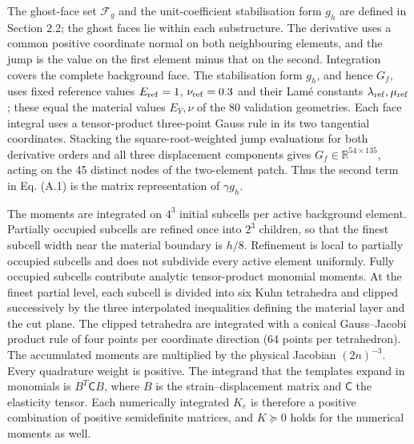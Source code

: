\documentclass[preprint,12pt,authoryear]{elsarticle}
\begin{document}
The ghost-face set \(\mathcal F_g\) and the unit-coefficient stabilisation form \(g_h\) are defined in Section 2.2; the ghost faces lie within each substructure. The derivative uses a common positive coordinate normal on both neighbouring elements, and the jump is the value on the first element minus that on the second. Integration covers the complete background face. The stabilisation form \(g_h\), and hence \(G_f\), uses fixed reference values \(E_{\rm ref}=1\), \(\nu_{\rm ref}=0.3\) and their Lamé constants \(\lambda_{\rm ref},\mu_{\rm ref}\); these equal the material values \(E_Y,\nu\) of the 80 validation geometries. Each face integral uses a tensor-product three-point Gauss rule in its two tangential coordinates. Stacking the square-root-weighted jump evaluations for both derivative orders and all three displacement components gives \(G_f\in\mathbb R^{54\times135}\), acting on the 45 distinct nodes of the two-element patch. Thus the second term in Eq. (A.1) is the matrix representation of \(\gamma g_h\).

The moments are integrated on \(4^3\) initial subcells per active background element. Partially occupied subcells are refined once into \(2^3\) children, so that the finest subcell width near the material boundary is \(h/8\). Refinement is local to partially occupied subcells and does not subdivide every active element uniformly. Fully occupied subcells contribute analytic tensor-product monomial moments. At the finest partial level, each subcell is divided into six Kuhn tetrahedra and clipped successively by the three interpolated inequalities defining the material layer and the cut plane. The clipped tetrahedra are integrated with a conical Gauss--Jacobi product rule of four points per coordinate direction (64 points per tetrahedron). The accumulated moments are multiplied by the physical Jacobian \((2n)^{-3}\). Every quadrature weight is positive. The integrand that the templates expand in monomials is \(B^T\mathsf CB\), where \(B\) is the strain--displacement matrix and \(\mathsf C\) the elasticity tensor. Each numerically integrated \(K_e\) is therefore a positive combination of positive semidefinite matrices, and \(K\succeq0\) holds for the numerical moments as well.
\end{document}

